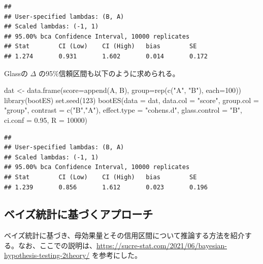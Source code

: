 \documentclass[
  ja=standard, xelatex, base=12pt]{bxjsreport}
\newenvironment{Shaded}{\begin{snugshade}}{\end{snugshade}}
\newcommand{\AttributeTok}[1]{\textcolor[rgb]{0.77,0.63,0.00}{#1}}
\newcommand{\DecValTok}[1]{\textcolor[rgb]{0.00,0.00,0.81}{#1}}
\newcommand{\FloatTok}[1]{\textcolor[rgb]{0.00,0.00,0.81}{#1}}
\newcommand{\FunctionTok}[1]{\textcolor[rgb]{0.00,0.00,0.00}{#1}}
\newcommand{\NormalTok}[1]{#1}
\newcommand{\OtherTok}[1]{\textcolor[rgb]{0.56,0.35,0.01}{#1}}
\newcommand{\StringTok}[1]{\textcolor[rgb]{0.31,0.60,0.02}{#1}}
\begin{document}
\begin{verbatim}
## 
## User-specified lambdas: (B, A)
## Scaled lambdas: (-1, 1)
## 95.00% bca Confidence Interval, 10000 replicates
## Stat        CI (Low)    CI (High)   bias        SE          
## 1.274       0.931       1.602       0.014       0.172
\end{verbatim}

Glassの \(\Delta\) の95\%信頼区間も以下のように求められる。

\begin{Shaded}
\begin{Highlighting}[]
\NormalTok{dat }\OtherTok{\textless{}{-}} \FunctionTok{data.frame}\NormalTok{(}\AttributeTok{score=}\FunctionTok{append}\NormalTok{(A, B), }\AttributeTok{group=}\FunctionTok{rep}\NormalTok{(}\FunctionTok{c}\NormalTok{(}\StringTok{"A"}\NormalTok{, }\StringTok{"B"}\NormalTok{), }\AttributeTok{each=}\DecValTok{100}\NormalTok{))}
\FunctionTok{library}\NormalTok{(bootES)}
\FunctionTok{set.seed}\NormalTok{(}\DecValTok{123}\NormalTok{)}
\FunctionTok{bootES}\NormalTok{(}\AttributeTok{data =}\NormalTok{ dat, }\AttributeTok{data.col =} \StringTok{"score"}\NormalTok{, }\AttributeTok{group.col =} \StringTok{"group"}\NormalTok{, }\AttributeTok{contrast =} \FunctionTok{c}\NormalTok{(}\StringTok{"B"}\NormalTok{,}\StringTok{"A"}\NormalTok{), }
       \AttributeTok{effect.type =} \StringTok{"cohens.d"}\NormalTok{, }\AttributeTok{glass.control =} \StringTok{"B"}\NormalTok{, }\AttributeTok{ci.conf =} \FloatTok{0.95}\NormalTok{, }\AttributeTok{R =} \DecValTok{10000}\NormalTok{)}
\end{Highlighting}
\end{Shaded}

\begin{verbatim}
## 
## User-specified lambdas: (B, A)
## Scaled lambdas: (-1, 1)
## 95.00% bca Confidence Interval, 10000 replicates
## Stat        CI (Low)    CI (High)   bias        SE          
## 1.239       0.856       1.612       0.023       0.196
\end{verbatim}

\hypertarget{ux30d9ux30a4ux30baux7d71ux8a08ux306bux57faux3065ux304fux30a2ux30d7ux30edux30fcux30c1-2}{%
\subsection{ベイズ統計に基づくアプローチ}\label{ux30d9ux30a4ux30baux7d71ux8a08ux306bux57faux3065ux304fux30a2ux30d7ux30edux30fcux30c1-2}}

ベイズ統計に基づき、母効果量とその信用区間について推論する方法を紹介する。なお、ここでの説明は、\url{https://sucre-stat.com/2021/06/bayesian-hypothesis-testing-2theory/} を参考にした。
\end{document}

